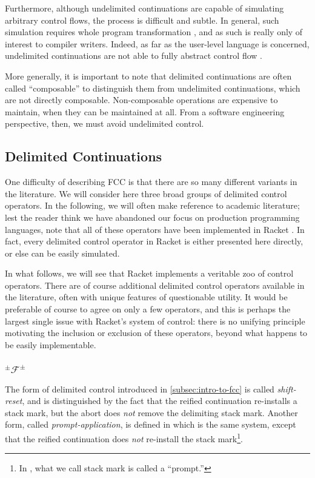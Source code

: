 \documentclass[11pt]{article}
\newcommand{\maybePage}{\newpage}
\newcommand\F{\mathcal{F}}
\newcommand\pmFpm{^\pm\F^\pm}
\begin{document}
Furthermore, although undelimited continuations are capable of simulating arbitrary control flows, the process is difficult and subtle.
In general, such simulation requires whole program transformation \cite{Filinski94}, and as such is really only of interest to compiler writers.
Indeed, as far as the user-level language is concerned, undelimited continuations are not able to fully abstract control flow \cite{Sitaram90}.

More generally, it is important to note that delimited continuations are often called ``composable'' to distinguish them from undelimited continuations, which are not directly composable.
Non-composable operations are expensive to maintain, when they can be maintained at all.
From a software engineering perspective, then, we must avoid undelimited control.


\maybePage
\subsection{Delimited Continuations}
\label{delimControl}

One difficulty of describing FCC is that there are so many different variants in the literature.
We will consider here three broad groups of delimited control operators.
In the following, we will often make reference to academic literature;
lest the reader think we have abandoned our focus on production programming languages, note that all of these operators have been implemented in Racket \cite{RacketReference}.
In fact, every delimited control operator in Racket is either presented here directly, or else can be easily simulated.

In what follows, we will see that Racket implements a veritable zoo of control operators.
There are of course additional delimited control operators available in the literature, often with unique features of questionable utility.
It would be preferable of course to agree on only a few operators, and this is perhaps the largest single issue with Racket's system of control: there is no unifying principle motivating the inclusion or exclusion of these operators, beyond what happens to be easily implementable.

\maybePage
\subsubsection{$\pmFpm$}

The form of delimited control introduced in \ref{subsec:intro-to-fcc} is called \textit{shift-reset}, and is distinguished by the fact that the reified continuation re-installs a stack mark, but the abort does \emph{not} remove the delimiting stack mark.
Another form, called \emph{prompt-application}, is defined in \cite{PromptApplication} which is the same system, except that the reified continuation does \emph{not} re-install the stack mark\footnote{In \cite{PromptApplication}, what we call stack mark is called a ``prompt.''}.
\end{document}
